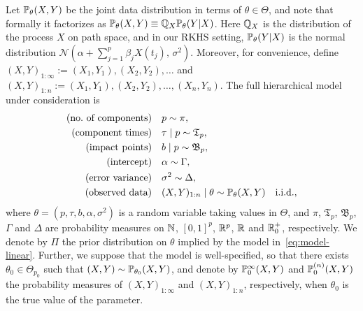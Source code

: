 Let \(\mathbb{P}_{\theta}(X,Y)\) be the joint data distribution in terms of \(\theta\in\Theta\), and note that formally it factorizes as \(\mathbb{P}_{\theta}(X,Y)\equiv\mathbb{Q}_X \mathbb{P}_\theta(Y|X)\). Here \(\mathbb{Q}_X\) is the distribution of the process \(X\) on path space, and in our \acs{RKHS} setting, \(\mathbb{P}_\theta(Y|X)\) is the normal distribution \(\mathcal N(\alpha + \sum_{j=1}^p \beta_j X(t_j),\, \sigma^2)\). Moreover, for convenience, define \((X,Y)_{1:\infty} := (X_1, Y_1), (X_2, Y_2), \dots\) and \((X,Y)_{1:n} := (X_1,Y_1), (X_2, Y_2), \dots, (X_n, Y_n)\). The full hierarchical model under consideration is
\begin{equation}\label{eq:model-linear}
  \begin{split}
    \text{(no.\ of components)}\quad & p \sim \pi,                                                                                    \\
    \text{(component times)}\quad    & \tau \mid p \sim \mathfrak{T}_p,                                                                     \\
    \text{(impact points)}\quad   & b \mid p \sim \mathfrak{B}_p,                                                                        \\
    \text{(intercept)}\quad          & \alpha \sim \Gamma,                                                                                     \\
    \text{(error variance)}\quad     & \sigma^2 \sim \Delta,                                                                                   \\
    \text{(observed data)}\quad      & (X,Y)_{1:n} \mid \theta \sim \mathbb{P}_{\theta}(X,Y) \quad \text{i.i.d.},
  \end{split}
\end{equation}
where \(\theta = (p, \tau, b, \alpha, \sigma^2)\) is a random variable taking values in \(\Theta\), and \(\pi\), \(\mathfrak{T}_p\), \(\mathfrak{B}_p\), \(\Gamma\) and \(\Delta\) are probability measures on \(\mathbb{N}\), \([0,1]^p\), \(\mathbb{R}^p\), \(\mathbb{R}\) and \(\mathbb{R}^+_0\), respectively. We denote by \(\Pi\) the prior distribution on \(\theta\) implied by the model in~\eqref{eq:model-linear}. Further, we suppose that the model is well-specified, so that there exists \(\theta_0\in\Theta_{p_0}\) such that \((X,Y)\sim \mathbb{P}_{\theta_0}(X,Y)\), and denote by \(\mathbb{P}_0^\infty(X,Y)\) and \(\mathbb{P}_0^{(n)}(X,Y)\) the probability measures of \((X,Y)_{1:\infty}\) and \((X,Y)_{1:n}\), respectively, when \(\theta_0\) is the true value of the parameter.

